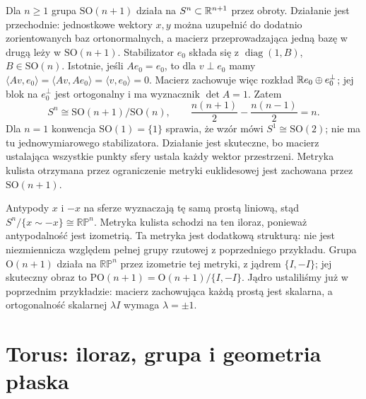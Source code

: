 \begin{przyklad}
\label{prz:klein-sfera}
Dla $n\geq1$ grupa $\mathrm{SO}(n+1)$ działa na
$S^n\subset\mathbb{R}^{n+1}$ przez obroty. Działanie jest
przechodnie: jednostkowe wektory $x,y$ można uzupełnić
do dodatnio zorientowanych baz ortonormalnych, a macierz
przeprowadzająca jedną bazę w drugą leży w
$\mathrm{SO}(n+1)$. Stabilizator $e_0$ składa się z
$\operatorname{diag}(1,B)$, $B\in\mathrm{SO}(n)$.
Istotnie, jeśli $Ae_0=e_0$, to dla $v\perp e_0$
mamy $\langle Av,e_0\rangle
=\langle Av,Ae_0\rangle=\langle v,e_0\rangle=0$.
Macierz zachowuje więc rozkład
$\mathbb{R} e_0\oplus e_0^\perp$; jej blok na $e_0^\perp$
jest ortogonalny i ma wyznacznik $\det A=1$.
Zatem
\[
 S^n\cong\mathrm{SO}(n+1)/\mathrm{SO}(n),
 \qquad
 \frac{n(n+1)}2-\frac{n(n-1)}2=n.
\]
Dla $n=1$ konwencja $\mathrm{SO}(1)=\{1\}$ sprawia,
że wzór mówi $S^1\cong\mathrm{SO}(2)$; nie ma tu
jednowymiarowego stabilizatora. Działanie jest skuteczne,
bo macierz ustalająca wszystkie punkty sfery ustala
każdy wektor przestrzeni. Metryka kulista otrzymana
przez ograniczenie metryki euklidesowej jest zachowana
przez $\mathrm{SO}(n+1)$.

Antypody $x$ i $-x$ na sferze wyznaczają tę samą
prostą liniową, stąd $S^n/\{x\sim-x\}\cong\mathbb{RP}^n$.
Metryka kulista schodzi na ten iloraz, ponieważ
antypodalność jest izometrią. Ta metryka jest dodatkową
strukturą: nie jest niezmiennicza względem pełnej grupy
rzutowej z poprzedniego przykładu. Grupa
$\mathrm O(n+1)$ działa na $\mathbb{RP}^n$ przez izometrie
tej metryki, z jądrem $\{I,-I\}$; jej skuteczny obraz
to $\mathrm{PO}(n+1)=\mathrm O(n+1)/\{I,-I\}$.
Jądro ustaliliśmy już w poprzednim przykładzie:
macierz zachowująca każdą prostą jest skalarna,
a ortogonalność skalarnej $\lambda I$ wymaga $\lambda=\pm1$.
\end{przyklad}

\section{Torus: iloraz, grupa i geometria płaska}
\label{sec:klein-torus}

